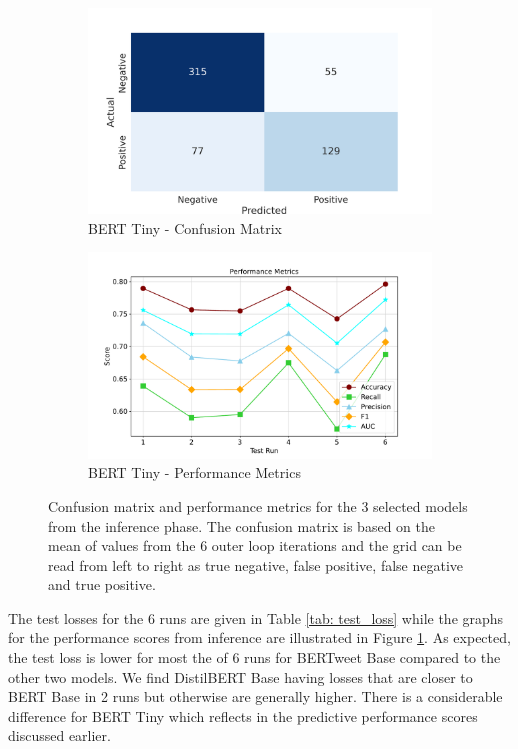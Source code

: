 \begin{figure}[!ht]
    \begin{subfigure}{0.45\linewidth}
        \includegraphics[width=\linewidth]{figures/confusion_berttiny.png}
        \caption{BERT Tiny - Confusion Matrix}
    \end{subfigure}
    \hfil
    \begin{subfigure}{0.45\linewidth}
        \includegraphics[width=\linewidth]{figures/metrics_line_berrttiny.pdf}
        \caption{BERT Tiny - Performance Metrics}
    \end{subfigure}
    \caption{Confusion matrix and performance metrics for the 3 selected models from the inference phase. The confusion matrix is based on the mean of values from the 6 outer loop iterations and the grid can be read from left to right as true negative, false positive, false negative and true positive.}
    \label{fig: deep_dive_results}
\end{figure}

The test losses for the 6 runs are given in Table \ref{tab: test_loss} while the graphs for the performance scores from inference are illustrated in Figure \ref{fig: deep_dive_results}. As expected, the test loss is lower for most the of 6 runs for BERTweet Base compared to the other two models. We find DistilBERT Base having losses that are closer to BERT Base in 2 runs but otherwise are generally higher. There is a considerable difference for BERT Tiny which reflects in the predictive performance scores discussed earlier. \\

